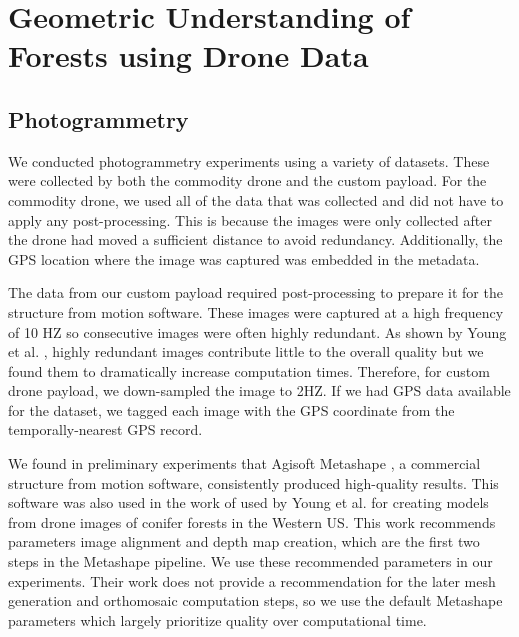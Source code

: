 %
%
%    

\section{Geometric Understanding of Forests using Drone Data}


\subsection{Photogrammetry}
\label{sec:methods:photogrammetry}
We conducted photogrammetry experiments using a variety of datasets. These were collected by both the commodity drone and the custom payload. For the commodity drone, we used all of the data that was collected and did not have to apply any post-processing. This is because the images were only collected after the drone had moved a sufficient distance to avoid redundancy. Additionally, the GPS location where the image was captured was embedded in the metadata.

The data from our custom payload required post-processing to prepare it for the structure from motion software. These images were captured at a high frequency of 10 HZ so consecutive images were often highly redundant. As shown by Young et al. \cite{Young2022}, highly redundant images contribute little to the overall quality but we found them to dramatically increase computation times. Therefore, for custom drone payload, we down-sampled the image to 2HZ. If we had GPS data available for the dataset, we tagged each image with the GPS coordinate from the temporally-nearest GPS record.   

We found in preliminary experiments that Agisoft Metashape \cite{AgisoftMetashape}, a commercial structure from motion software, consistently produced high-quality results. This software was also used in the work of used by Young et al. \cite{Young2022} for creating models from drone images of conifer forests in the Western US. This work recommends parameters image alignment and depth map creation, which are the first two steps in the Metashape pipeline. We use these recommended parameters in our experiments. Their work does not provide a recommendation for the later mesh generation and orthomosaic computation steps, so we use the default Metashape parameters which largely prioritize quality over computational time. 

